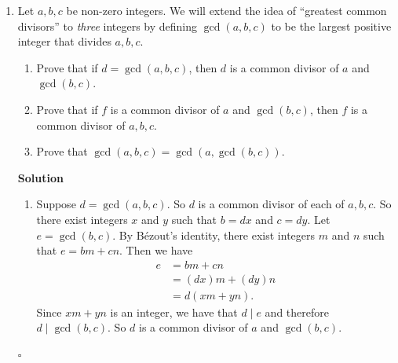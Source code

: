 \documentclass[11pt]{article}
\newcommand{\divides}{\mid}
\newenvironment{solution}{\par\noindent\textbf{Solution}\quad}{\hfill$\square$\par}
\newenvironment{notes}{\par\noindent\textbf{Notes}\quad}{\par}
\begin{document}
\begin{enumerate}[label=\arabic*.]
    \begin{solution}
    By the Division theorem, we have $a=b\cdot q+r$ such that $0<r\leq b$. Then
    \begin{align*}
        -a &= -(b\cdot q+r) \\
           &= b\cdot -q-r \\
           &= b\cdot (-q-1)+b-r.
    \end{align*}

    We claim that when $-a$ is divided by $b$, the quotient is $-q-1$ and the remainder is $b-r$. The Division theorem says that there exist unique integers $q'$ and $r'$ such that $-a=b\cdot q' + r'$, where $0\leq r'<b$, so by setting $q'=-q-1$, it suffices to show that $r'=b-r$ by showing $0\leq b-r<b$.

    Recall that we started with $0<r<b$, since $r>0$. From this we have $0>-r>-b$, which gives us $b>b-r>0$. So $b-r$ satisfies the conditions of the Division theorem.
    \end{solution}

    \begin{notes}
    This one involves some algebraic manipulation to get a neat consequence of the Division theorem for negative numbers. Being careful, especially with the inequalities, is important.
    \end{notes}

    \item Let $a,b,c$ be non-zero integers. We will extend the idea of ``greatest common divisors'' to \emph{three} integers by defining $\gcd(a,b,c)$ to be the largest positive integer that divides $a,b,c$.

    \begin{enumerate}[label=(\alph*)]
        \item Prove that if $d=\gcd(a,b,c)$, then $d$ is a common divisor of $a$ and $\gcd(b,c)$.
        \item Prove that if $f$ is a common divisor of $a$ and $\gcd(b,c)$, then $f$ is a common divisor of $a,b,c$.
        \item Prove that $\gcd(a,b,c)=\gcd(a,\gcd(b,c))$.
    \end{enumerate}

    \begin{solution}
    \begin{enumerate}[label=(\alph*)]
        \item Suppose $d=\gcd(a,b,c)$. So $d$ is a common divisor of each of $a,b,c$. So there exist integers $x$ and $y$ such that $b=dx$ and $c=dy$. Let $e=\gcd(b,c)$. By B\'{e}zout's identity, there exist integers $m$ and $n$ such that $e=bm+cn$. Then we have
        \begin{align*}
            e &= bm+cn \\
              &= (dx)m+(dy)n \\
              &= d(xm+yn).
        \end{align*}
        Since $xm+yn$ is an integer, we have that $d\divides e$ and therefore $d\divides \gcd(b,c)$. So $d$ is a common divisor of $a$ and $\gcd(b,c)$.


\end{enumerate}
\end{solution}
\end{enumerate}
\end{document}
